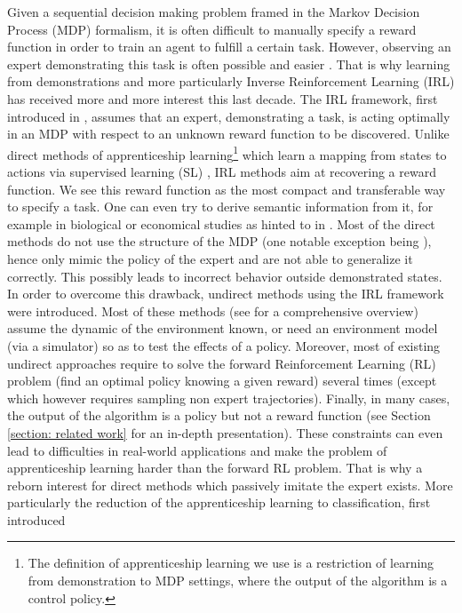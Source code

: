 \documentclass[11pt]{article}
\newcommand{\0}{\mathbf{0}}
\newcommand{\1}{\mathbf{1}}
\begin{document}
Given a sequential decision making problem framed in the Markov Decision Process (MDP) formalism, it is often difficult to manually specify a reward function in order to train an agent to fulfill a certain task. However, observing an expert demonstrating this task is often possible and easier \cite{russell1998learning}. That is why learning from demonstrations and more particularly Inverse Reinforcement Learning (IRL) has received more and more interest this last decade. The IRL framework, first introduced in \cite{russell1998learning,ng2000algorithms}, assumes that an expert, demonstrating a task, is acting optimally in an MDP with respect to an unknown reward function to be discovered. Unlike direct methods of apprenticeship learning\footnote{The definition of apprenticeship learning we use is a restriction of learning from demonstration to MDP settings, where the output of the algorithm is a control policy. } which learn a mapping from states to actions via supervised learning (SL) \cite{atkeson1997robot,pomerleau1989alvinn}, IRL methods aim at recovering a reward function. We see this reward function as the most compact and transferable way to specify a task. One can even try to derive semantic information from it, for example in biological or economical studies as hinted to in \cite{russell1998learning}.
Most of the direct methods do not use the structure of the MDP (one notable exception being \cite{melo2010learning}), hence only mimic the policy of the expert and are not able to generalize it correctly. This possibly leads to incorrect behavior outside demonstrated states.
In order to overcome this drawback, undirect methods using the IRL framework \cite{abbeel2004apprenticeship} were introduced. Most of these methods (see \cite{neu2009training} for a comprehensive overview) assume the dynamic of the environment known, or need an environment model (via a simulator) so as to test the effects of a policy. Moreover, most of existing undirect approaches require to solve the forward Reinforcement Learning (RL) problem (find an optimal policy knowing a given reward) several times (except  \cite{boularias2011relative} which however requires sampling non expert trajectories).
Finally, in many cases, the output of the algorithm is a policy but not a reward function (see Section \ref{section: related work} for an in-depth presentation). These constraints can even lead to difficulties in real-world applications and make the problem of apprenticeship learning harder than the forward RL problem. That is why a reborn interest for direct methods which passively imitate the expert exists. More particularly the reduction of the apprenticeship learning to classification, first introduced 
\end{document}
